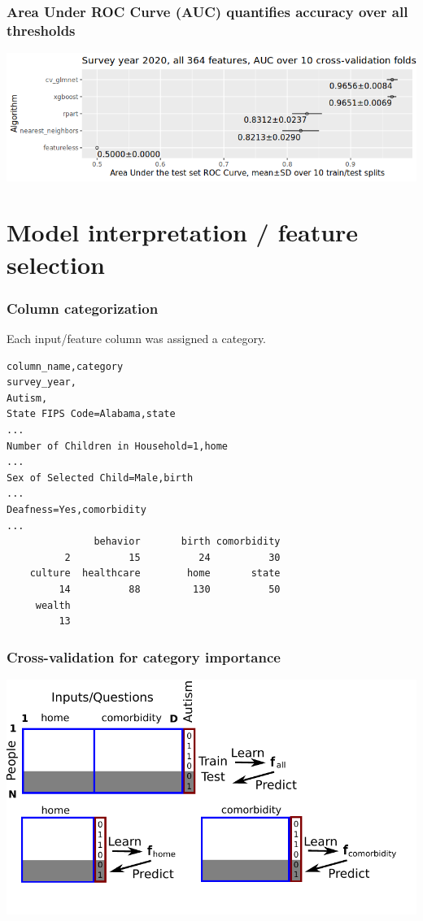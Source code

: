 \documentclass{beamer}
\begin{document}
\begin{frame}
  \frametitle{Area Under ROC Curve (AUC) quantifies accuracy over all thresholds}
  \includegraphics[width=\textwidth]{download-nsch-mlr3batchmark-registry-one-set-all-features-auc.png}
\end{frame}

\section{Model interpretation / feature selection}

\begin{frame}[fragile]
  \frametitle{Column categorization}
Each input/feature column was assigned a category.
\begin{verbatim}
column_name,category
survey_year,
Autism,
State FIPS Code=Alabama,state
...
Number of Children in Household=1,home
...
Sex of Selected Child=Male,birth
...
Deafness=Yes,comorbidity
...
               behavior       birth comorbidity 
          2          15          24          30 
    culture  healthcare        home       state 
         14          88         130          50 
     wealth 
         13 
\end{verbatim}
\end{frame}

\begin{frame}
  \frametitle{Cross-validation for category importance}
  \includegraphics[width=\textwidth]{drawing-cv-feature-sets.pdf}
\end{frame}
\end{document}
